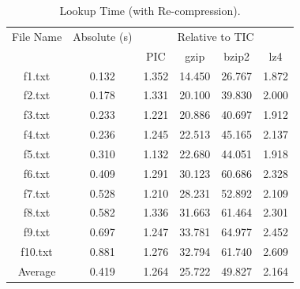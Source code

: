 \begin{table}[ht]
\centering
\begin{tabular}{cccccc}
\hline
File Name & Absolute (s) & \multicolumn{4}{c}{Relative to TIC} \\
 &  & PIC & gzip & bzip2 & lz4 \\
\hline
f1.txt & 0.132 & 1.352 & 14.450 & 26.767 & 1.872 \\
f2.txt & 0.178 & 1.331 & 20.100 & 39.830 & 2.000 \\
f3.txt & 0.233 & 1.221 & 20.886 & 40.697 & 1.912 \\
f4.txt & 0.236 & 1.245 & 22.513 & 45.165 & 2.137 \\
f5.txt & 0.310 & 1.132 & 22.680 & 44.051 & 1.918 \\
f6.txt & 0.409 & 1.291 & 30.123 & 60.686 & 2.328 \\
f7.txt & 0.528 & 1.210 & 28.231 & 52.892 & 2.109 \\
f8.txt & 0.582 & 1.336 & 31.663 & 61.464 & 2.301 \\
f9.txt & 0.697 & 1.247 & 33.781 & 64.977 & 2.452 \\
f10.txt & 0.881 & 1.276 & 32.794 & 61.740 & 2.609 \\
Average & 0.419 & 1.264 & 25.722 & 49.827 & 2.164 \\
\hline
\end{tabular}
\caption{Lookup Time (with Re-compression).}
\label{tab:lookup_with_recompression}
\end{table}
